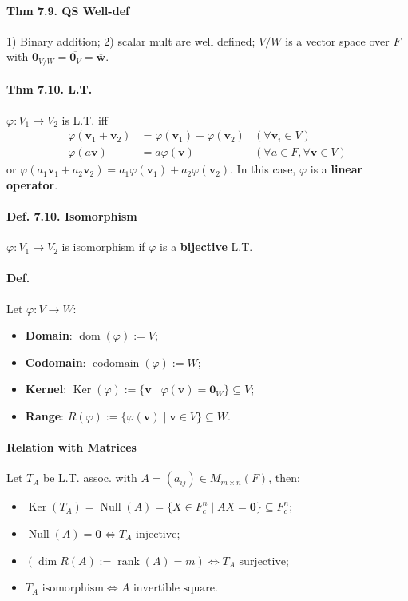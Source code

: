 \paragraph{Thm 7.9. QS Well-def} 1) Binary addition; 2) scalar mult are well defined; $V/W$ is a vector space over $F$ with $\mathbf{0}_{V/W}=\overline{\mathbf{0}_V}=\overline{\mathbf{w}}$.

\paragraph{Thm 7.10. L.T.} $\varphi: V_1\rightarrow V_2$ is L.T. iff
$$
\begin{aligned}
\varphi(\mathbf{v}_1 + \mathbf{v}_2) &= \varphi(\mathbf{v}_1) + \varphi(\mathbf{v}_2) & (\forall \mathbf{v}_i \in V)\\
\varphi(a\mathbf{v}) &= a\varphi (\mathbf{v}) & (\forall a \in F, \forall \mathbf{v}\in V)
\end{aligned}
$$
or $\varphi(a_1\mathbf{v}_1 + a_2 \mathbf{v}_2) = a_1 \varphi (\mathbf{v}_1) + a_2 \varphi (\mathbf{v}_2)$. In this case, $\varphi$ is a \textbf{linear operator}. 

\paragraph{Def. 7.10. Isomorphism} $\varphi: V_1\rightarrow V_2$ is isomorphism if $\varphi$ is a \textbf{bijective} L.T. 

\paragraph{Def.} Let $\varphi: V\rightarrow W$:
\begin{itemize}[noitemsep,nolistsep]
    \item \textbf{Domain}: $\operatorname{dom}(\varphi) := V$;
    \item \textbf{Codomain}: $\operatorname{codomain}(\varphi):=W$;
    \item \textbf{Kernel}: $\operatorname{Ker}(\varphi):=\{\mathbf{v}\mid \varphi(\mathbf{v}) = \mathbf{0}_W\}\subseteq V$;
    \item \textbf{Range}: $R(\varphi):=\{\varphi(\mathbf{v})\mid \mathbf{v}\in V\}\subseteq W$.
\end{itemize}

\paragraph{Relation with Matrices} Let $T_A$ be L.T. assoc. with $A=(a_{ij})\in M_{m\times n}(F)$, then:
\begin{itemize}[noitemsep,nolistsep]
    \item $\operatorname{Ker}(T_A) =\operatorname{Null}(A) =\{X\in F_c^n\mid AX=\mathbf{0}\}\subseteq F_c^n$;
    \item $\operatorname{Null}(A)=\mathbf{0} \Leftrightarrow T_A\text{ injective}$;
    \item $(\dim R(A):=\operatorname{rank}(A)=m)\Leftrightarrow T_A \text{ surjective}$;
    \item $T_A \text{ isomorphism} \Leftrightarrow A \text{ invertible square}$.
\end{itemize}

